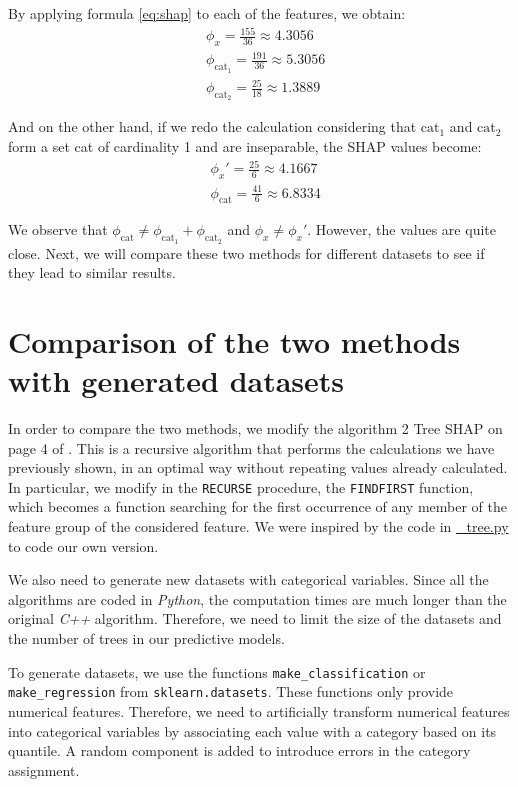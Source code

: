 \documentclass[11pt]{article}
\begin{document}
By applying formula \ref{eq:shap} to each of the features, we obtain:
\begin{align*}
    & \phi_x = \frac{155}{36} \approx 4.3056\\
    & \phi_{\text{cat}_1} = \frac{191}{36} \approx 5.3056 \\
    & \phi_{\text{cat}_2} = \frac{25}{18} \approx 1.3889
\end{align*}

And on the other hand, if we redo the calculation considering that $\text{cat}_1$ and $\text{cat}_2$ form 
a set cat of cardinality 1 and are inseparable, the SHAP values become:
\begin{align*}
    & \phi_x' = \frac{25}{6} \approx 4.1667\\
    & \phi_{\text{cat}} = \frac{41}{6} \approx 6.8334
\end{align*}

We observe that $\phi_{\text{cat}} \neq  \phi_{\text{cat}_1}+\phi_{\text{cat}_2} $ and 
$\phi_x \neq  \phi_x'$. However, the values are quite close. Next, we will 
compare these two methods for different datasets to see if they lead to similar results.

\section*{Comparison of the two methods with generated datasets}

In order to compare the two methods, we modify the algorithm 2 Tree SHAP on page 4 of \cite{lundberg2019consistent}. 
This is a recursive algorithm that performs the calculations we have previously 
shown, in an optimal way without repeating values already calculated. In particular, we modify in the 
\texttt{RECURSE} procedure, the \texttt{FINDFIRST} function, which becomes a function searching for the first 
occurrence of any member of the feature group of the considered feature. We were inspired by the code in 
\href{https://github.com/shap/shap/blob/master/shap/explainers/_tree.py}{\_tree.py} to code our own version.

We also need to generate new datasets with categorical variables. Since all the algorithms are coded in \textit{Python}, 
the computation times are much longer than the original \textit{C++} algorithm. Therefore, we need to limit the size of 
the datasets and the number of trees in our predictive models.

To generate datasets, we use the functions \texttt{make\_classification} or \texttt{make\_regression} from
\texttt{sklearn.datasets}. These functions only provide numerical features. Therefore, we need to artificially 
transform numerical features into categorical variables by associating each value with a category based on its 
quantile. A random component is added to introduce errors in the category assignment.
\end{document}
